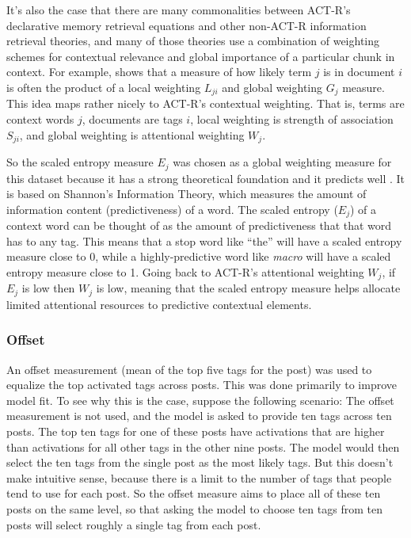 \documentclass[10pt,letterpaper]{article}
\begin{document}
It's also the case that there are many commonalities between ACT-R's declarative memory retrieval equations and other non-ACT-R information retrieval theories,
and many of those theories use a combination of weighting schemes for contextual relevance and global importance of a particular chunk in context.
For example,  shows that a measure of how likely term $j$ is in document $i$ is often the product of a local weighting $L_{ji}$ and global weighting $G_{j}$ measure.
This idea maps rather nicely to ACT-R's contextual weighting.
That is, terms are context words $j$, documents are tags $i$, local weighting is strength of association $S_{ji}$, and global weighting is attentional weighting $W_{j}$.

So the scaled entropy measure $E_{j}$ was chosen as a global weighting measure for this dataset because it has a strong theoretical foundation and it predicts well \cite{Dumais1991}.
It is based on Shannon's Information Theory, which measures the amount of information content (predictiveness) of a word.
The scaled entropy ($E_{j}$) of a context word can be thought of as the amount of predictiveness that that word has to any tag.
This means that a stop word like ``the'' will have a scaled entropy measure close to 0, while a highly-predictive word like \emph{macro} will have a scaled entropy measure close to 1.
Going back to ACT-R's attentional weighting $W_{j}$, if $E_{j}$ is low then $W_{j}$ is low, meaning that the scaled entropy measure helps allocate limited attentional resources to predictive contextual elements.

\subsubsection{Offset}

An offset measurement (mean of the top five tags for the post) was used to equalize the top activated tags across posts.
This was done primarily to improve model fit.
To see why this is the case, suppose the following scenario:
The offset measurement is not used, and the model is asked to provide ten tags across ten posts.
The top ten tags for one of these posts have activations that are higher than activations for all other tags in the other nine posts.
The model would then select the ten tags from the single post as the most likely tags.
But this doesn't make intuitive sense, because there is a limit to the number of tags that people tend to use for each post.
So the offset measure aims to place all of these ten posts on the same level, so that asking the model to choose ten tags from ten posts will select roughly a single tag from each post.
\end{document}

